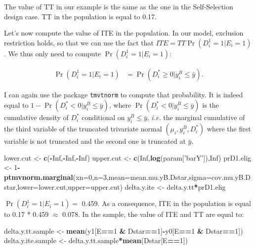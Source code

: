 \documentclass[]{book}
\newenvironment{Shaded}{\begin{snugshade}}{\end{snugshade}}
\newcommand{\DataTypeTok}[1]{\textcolor[rgb]{0.13,0.29,0.53}{#1}}
\newcommand{\DecValTok}[1]{\textcolor[rgb]{0.00,0.00,0.81}{#1}}
\newcommand{\KeywordTok}[1]{\textcolor[rgb]{0.13,0.29,0.53}{\textbf{#1}}}
\newcommand{\NormalTok}[1]{#1}
\newcommand{\OperatorTok}[1]{\textcolor[rgb]{0.81,0.36,0.00}{\textbf{#1}}}
\newcommand{\OtherTok}[1]{\textcolor[rgb]{0.56,0.35,0.01}{#1}}
\newcommand{\StringTok}[1]{\textcolor[rgb]{0.31,0.60,0.02}{#1}}
\theoremstyle{definition}
\theoremstyle{definition}
\theoremstyle{definition}
\theoremstyle{remark}
\begin{document}
The value of TT in our example is the same as the one in the Self-Selection design case.
TT in the population is equal to 0.17.

Let's now compute the value of ITE in the population.
In our model, exclusion restriction holds, so that we can use the fact that \(ITE=TT\Pr(D^1_i=1|E_i=1)\).
We thus only need to compute \(\Pr(D^1_i=1|E_i=1)\):

\begin{align*}
  \Pr(D^1_i=1|E_i=1) & = \Pr(D_i^*\geq0|y_i^B\leq\bar{y}).
\end{align*}

I can again use the package \texttt{tmvtnorm} to compute that probability.
It is indeed equal to \(1-\Pr(D_i^*<0|y_i^B\leq\bar{y})\), where \(\Pr(D_i^*<0|y_i^B\leq\bar{y})\) is the cumulative density of \(D_i^*\) conditional on \(y_i^B\leq\bar{y}\), \textit{i.e.} the marginal cumulative of the third variable of the truncated trivariate normal \((\mu_i,y_i^B,D_i^*)\) where the first variable is not truncated and the second one is truncated at \(\bar{y}\).

\begin{Shaded}
\begin{Highlighting}[]
\NormalTok{lower.cut <-}\StringTok{ }\KeywordTok{c}\NormalTok{(}\OperatorTok{-}\OtherTok{Inf}\NormalTok{,}\OperatorTok{-}\OtherTok{Inf}\NormalTok{,}\OperatorTok{-}\OtherTok{Inf}\NormalTok{)}
\NormalTok{upper.cut <-}\StringTok{ }\KeywordTok{c}\NormalTok{(}\OtherTok{Inf}\NormalTok{,}\KeywordTok{log}\NormalTok{(param[}\StringTok{'barY'}\NormalTok{]),}\OtherTok{Inf}\NormalTok{)}
\NormalTok{prD1.elig <-}\StringTok{ }\DecValTok{1}\OperatorTok{-}\KeywordTok{ptmvnorm.marginal}\NormalTok{(}\DataTypeTok{xn=}\DecValTok{0}\NormalTok{,}\DataTypeTok{n=}\DecValTok{3}\NormalTok{,}\DataTypeTok{mean=}\NormalTok{mean.mu.yB.Dstar,}\DataTypeTok{sigma=}\NormalTok{cov.mu.yB.Dstar,}\DataTypeTok{lower=}\NormalTok{lower.cut,}\DataTypeTok{upper=}\NormalTok{upper.cut)}
\NormalTok{delta.y.ite <-}\StringTok{ }\NormalTok{delta.y.tt}\OperatorTok{*}\NormalTok{prD1.elig}
\end{Highlighting}
\end{Shaded}

\(\Pr(D^1_i=1|E_i=1)=\) 0.459.
As a consequence, ITE in the population is equal to 0.17 * 0.459 \(\approx\) 0.078.
In the sample, the value of ITE and TT are equal to:

\begin{Shaded}
\begin{Highlighting}[]
\NormalTok{delta.y.tt.sample <-}\StringTok{ }\KeywordTok{mean}\NormalTok{(y1[E}\OperatorTok{==}\DecValTok{1} \OperatorTok{&}\StringTok{ }\NormalTok{Dstar}\OperatorTok{==}\DecValTok{1}\NormalTok{]}\OperatorTok{-}\NormalTok{y0[E}\OperatorTok{==}\DecValTok{1} \OperatorTok{&}\StringTok{ }\NormalTok{Dstar}\OperatorTok{==}\DecValTok{1}\NormalTok{])}
\NormalTok{delta.y.ite.sample <-}\StringTok{ }\NormalTok{delta.y.tt.sample}\OperatorTok{*}\KeywordTok{mean}\NormalTok{(Dstar[E}\OperatorTok{==}\DecValTok{1}\NormalTok{])}
\end{Highlighting}
\end{Shaded}
\end{document}
